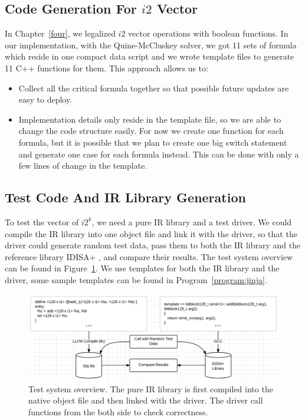 \subsection{Code Generation For $i2$ Vector}
In Chapter~\ref{four}, we legalized $i2$ vector operations with boolean functions. In our implementation, with the Quine-McCluskey solver, we got 11 sets of formula which reside in one compact data script and we wrote template files to generate 11 C++ functions for them. This approach allows us to:
\begin{itemize}
    \item Collect all the critical formula together so that possible future updates are easy to deploy.
    \item Implementation details only reside in the template file, so we are able to change the code structure easily. For now we create one function for each formula, but it is possible that we plan to create one big switch statement and generate one case for each formula instead. This can be done with only a few lines of change in the template.
\end{itemize}

\subsection{Test Code And IR Library Generation}
To test the vector of $i2^k$, we need a pure IR library and a test driver. We could compile the IR library into one object file and link it with the driver, so that the driver could generate random test data, pass them to both the IR library and the reference library IDISA+ \cite{hua_idisa}, and compare their results. The test system overview can be found in Figure~\ref{figure:test}. We use templates for both the IR library and the driver, some sample templates can be found in Program~\ref{program:jinja}.

\begin{figure}[ht!]
\centering
\includegraphics[width=140mm]{draw/test.png}
\caption[Test system overview.]{Test system overview. The pure IR library is first compiled into the native object file and then linked with the driver. The driver call functions from the both side to check correctness.}
\label{figure:test}
\end{figure}

